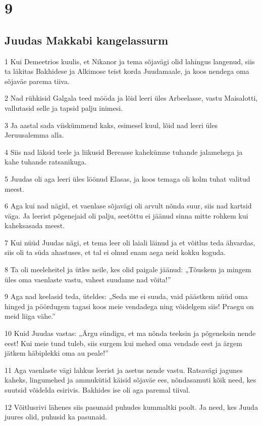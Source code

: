 \chapter{9}

\section*{Juudas Makkabi kangelassurm}

\par 1 Kui Demeetrios kuulis, et Nikanor ja tema sõjavägi olid lahingus langenud, siis ta läkitas Bakhidese ja Alkimose teist korda Juudamaale, ja koos nendega oma sõjaväe parema tiiva.
\par 2 Nad rühkisid Galgala teed mööda ja lõid leeri üles Arbeelasse, vastu Maisalotti, vallutasid selle ja tapsid palju inimesi.
\par 3 Ja aastal sada viiskümmend kaks, esimesel kuul, lõid nad leeri üles Jeruusalemma alla.
\par 4 Siis nad läksid teele ja liikusid Bereasse kahekümne tuhande jalamehega ja kahe tuhande ratsanikuga.
\par 5 Juudas oli aga leeri üles löönud Elasas, ja koos temaga oli kolm tuhat valitud meest.
\par 6 Aga kui nad nägid, et vaenlase sõjavägi oli arvult nõnda suur, siis nad kartsid väga. Ja leerist põgenejaid oli palju, seetõttu ei jäänud sinna mitte rohkem kui kaheksasada meest.
\par 7 Kui nüüd Juudas nägi, et tema leer oli laiali läinud ja et võitlus teda ähvardas, siis oli ta süda ahastuses, et tal ei olnud enam aega neid kokku koguda.
\par 8 Ta oli meeleheitel ja ütles neile, kes olid paigale jäänud: „Tõuskem ja mingem üles oma vaenlaste vastu, vahest suudame nad võita!”
\par 9 Aga nad keelasid teda, üteldes: „Seda me ei suuda, vaid päästkem nüüd oma hinged ja pöördugem tagasi koos meie vendadega ning võidelgem siis! Praegu on meid liiga vähe.”
\par 10 Kuid Juudas vastas: „Ärgu sündigu, et ma nõnda teeksin ja põgeneksin nende eest! Kui meie tund tuleb, siis surgem kui mehed oma vendade eest ja ärgem jätkem häbiplekki oma au peale!”
\par 11 Aga vaenlaste vägi lahkus leerist ja asetus nende vastu. Ratsavägi jagunes kaheks, lingumehed ja ammukütid käisid sõjaväe ees, nõndasamuti kõik need, kes suutsid võidelda esirivis. Bakhides ise oli aga paremal tiival.
\par 12 Võitlusrivi lähenes siis pasunaid puhudes kummaltki poolt. Ja need, kes Juuda juures olid, puhusid ka pasunaid.
